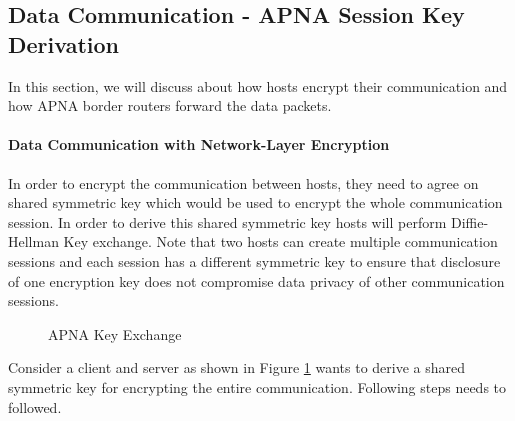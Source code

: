\subsection{Data Communication - APNA Session Key Derivation}
In this section, we will discuss about how hosts encrypt their communication and how APNA border routers forward the data packets.

\paragraph{Data Communication with Network-Layer Encryption}
In order to encrypt the communication between hosts, they need to agree on shared symmetric key which would be used to encrypt the whole communication session. In order to derive this shared symmetric key hosts will perform Diffie-Hellman Key exchange. Note that two hosts can create multiple communication sessions and each session has a different symmetric key to ensure that disclosure of one encryption key does not compromise data privacy of other communication sessions.

\begin{figure}[th!!]
\centering
\noindent
{}
\decoRule
\caption[APNA Handshake]{APNA Key Exchange}
\label{fig:apna_key_exchange}
\end{figure}


Consider a client and server as shown in Figure \ref{fig:apna_key_exchange} wants to derive a shared symmetric key for encrypting the entire communication. Following steps needs to followed.

